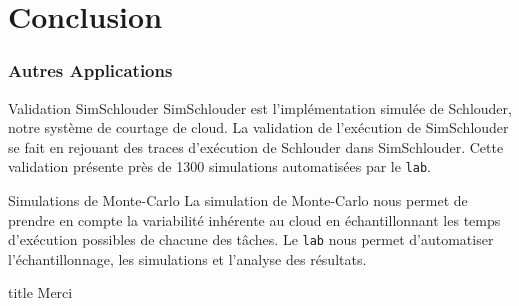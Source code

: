 \documentclass{beamer}
\newcommand{\lab}{\texttt{lab}}
\begin{document}
\section{Conclusion}

\begin{frame}
	\frametitle{Autres Applications}
	\begin{block}{Validation SimSchlouder}
		SimSchlouder est l'implémentation simulée de Schlouder, notre
		système de courtage de cloud. La validation de l'exécution de
		SimSchlouder se fait en rejouant des traces d'exécution de
		Schlouder dans SimSchlouder. Cette validation présente près de
		1300 simulations automatisées par le \lab.
	\end{block}
	\begin{block}{Simulations de Monte-Carlo}
		La simulation de Monte-Carlo nous permet de prendre en compte la
		variabilité inhérente au cloud en échantillonnant les temps
		d'exécution possibles de chacune des tâches. Le \lab{} nous 
		permet d'automatiser l'échantillonnage, les simulations et 
		l'analyse des résultats.
	\end{block}
\end{frame}

\begin{frame}
	\begin{beamercolorbox}[sep=8pt,center,shadow=true,rounded=true]{title}
		Merci\par
	\end{beamercolorbox}
\end{frame}
\end{document}
